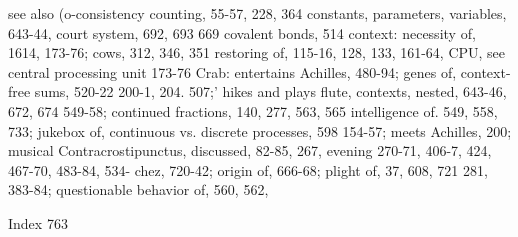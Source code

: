 see also (o-consistency                        counting, 55-57, 228, 364
constants, parameters, variables, 643-44,      court system, 692, 693
669                                            covalent bonds, 514
context: necessity of, 1614, 173-76;           cows, 312, 346, 351
restoring of, 115-16, 128, 133, 161-64,        CPU, see central processing unit
173-76                                         Crab: entertains Achilles, 480-94; genes of,
context-free sums, 520-22                      200-1, 204. 507;' hikes and plays flute,
contexts, nested, 643-46, 672, 674             549-58;
continued fractions, 140, 277, 563, 565        intelligence of. 549, 558, 733; jukebox of,
continuous vs. discrete processes, 598         154-57; meets Achilles, 200; musical
Contracrostipunctus, discussed, 82-85, 267,    evening
270-71, 406-7, 424, 467-70, 483-84, 534-       chez, 720-42; origin of, 666-68; plight of,
37, 608, 721                                   281,
                                               383-84; questionable behavior of, 560, 562,



Index                                                                                  763

